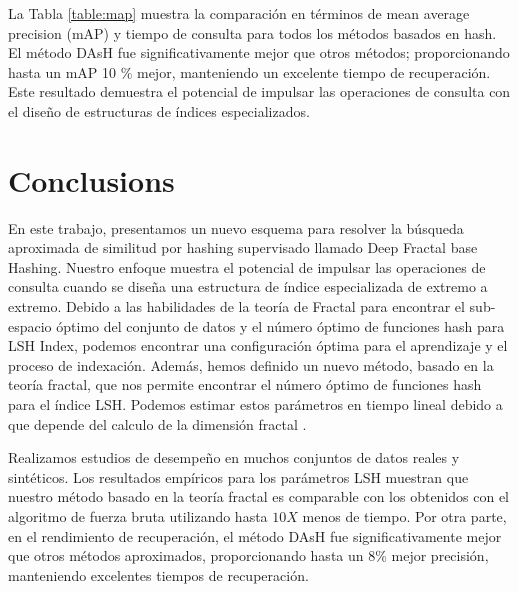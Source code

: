 La Tabla  \ref{table:map} muestra la comparación en términos de mean average precision (mAP)  y tiempo de consulta para todos los métodos basados en hash. El método DAsH fue significativamente mejor que otros métodos; proporcionando hasta un mAP 10 \% mejor,  manteniendo un excelente tiempo de recuperación. Este resultado demuestra el potencial de impulsar las operaciones de consulta con el diseño de estructuras de índices especializados.


\section{Conclusions}
En este trabajo, presentamos un nuevo esquema para resolver la búsqueda aproximada de similitud por hashing supervisado llamado Deep Fractal base Hashing. Nuestro enfoque muestra el potencial de impulsar las operaciones de consulta cuando se diseña una estructura de índice especializada de extremo a extremo. Debido a las habilidades de la teoría de Fractal para encontrar el sub-espacio óptimo del conjunto de datos y el número óptimo de funciones hash para LSH Index, podemos encontrar una configuración óptima para el aprendizaje y el proceso de indexación. Además, hemos definido un nuevo método, basado en la teoría fractal, que nos permite encontrar el número óptimo de funciones hash para el índice LSH. Podemos estimar estos parámetros en tiempo lineal debido a que depende del calculo de la dimensión fractal .

Realizamos estudios de desempeño en muchos conjuntos de datos reales y sintéticos. Los resultados empíricos para los parámetros LSH muestran que nuestro método basado en la teoría fractal es comparable con los obtenidos con el algoritmo de fuerza bruta utilizando hasta $10X$ menos de tiempo. Por otra parte, en el rendimiento de recuperación, el método DAsH fue significativamente mejor que otros métodos aproximados, proporcionando hasta un 8\% mejor precisión, manteniendo excelentes tiempos de recuperación.
